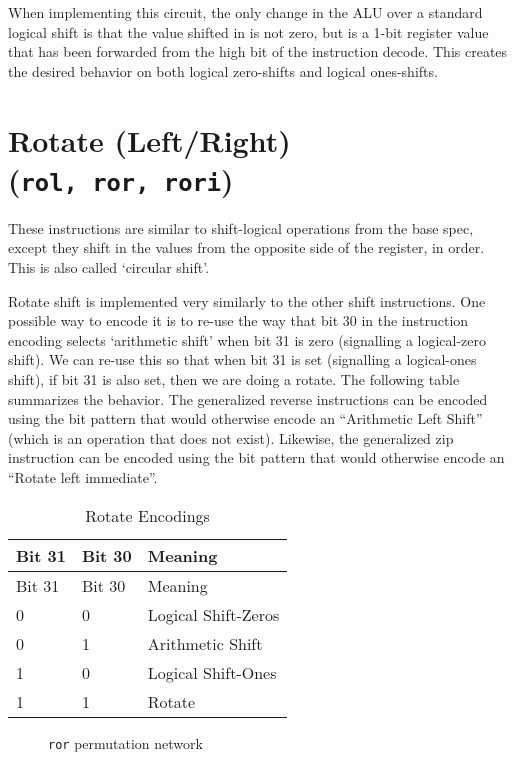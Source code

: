 When implementing this circuit, the only change in the ALU over a
standard logical shift is that the value shifted in is not zero, but is
a 1-bit register value that has been forwarded from the high bit of the
instruction decode. This creates the desired behavior on both logical
zero-shifts and logical ones-shifts.


\section{Rotate (Left/Right) (\texttt{rol,\ ror,\ rori})}

These instructions are similar to shift-logical operations from the base
spec, except they shift in the values from the opposite side of the
register, in order. This is also called `circular shift'.





Rotate shift is implemented very similarly to the other shift
instructions. One possible way to encode it is to re-use the way that
bit 30 in the instruction encoding selects `arithmetic shift' when bit
31 is zero (signalling a logical-zero shift). We can re-use this so that
when bit 31 is set (signalling a logical-ones shift), if bit 31 is also
set, then we are doing a rotate. The following table summarizes the
behavior. The generalized reverse instructions can be encoded using the
bit pattern that would otherwise encode an ``Arithmetic Left Shift''
(which is an operation that does not exist). Likewise, the generalized zip
instruction can be encoded using the bit pattern that would otherwise
encode an ``Rotate left immediate''.

\begin{longtable}[c]{@{}lll@{}}
\caption{Rotate Encodings}\tabularnewline
\toprule
Bit 31 & Bit 30 & Meaning\tabularnewline
\midrule
\endfirsthead
\toprule
Bit 31 & Bit 30 & Meaning\tabularnewline
\midrule
\endhead
0 & 0 & Logical Shift-Zeros\tabularnewline
0 & 1 & Arithmetic Shift\tabularnewline
1 & 0 & Logical Shift-Ones\tabularnewline
1 & 1 & Rotate\tabularnewline
\bottomrule
\end{longtable}


\begin{figure}[t]
\begin{center}

\end{center}
\caption{\texttt{ror} permutation network}
\label{permnet-ror}
\end{figure}

